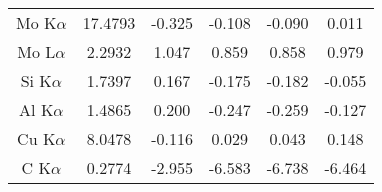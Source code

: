 \begin{table}[ht]
\begin{tabular}{cccccc}
        Mo K$\alpha$ & 17.4793           & -0.325       & -0.108       & -0.090                                & 0.011                                 \\
        Mo L$\alpha$ & 2.2932            & 1.047        & 0.859        & 0.858                                 & 0.979                                 \\
        Si K$\alpha$ & 1.7397            & 0.167        & -0.175       & -0.182                                & -0.055                                \\
        Al K$\alpha$ & 1.4865            & 0.200        & -0.247       & -0.259                                & -0.127                                \\
        Cu K$\alpha$ & 8.0478            & -0.116       & 0.029        & 0.043                                 & 0.148                                 \\
        C K$\alpha$  & 0.2774            & -2.955       & -6.583       & -6.738                                & -6.464
    \end{tabular}
\end{table}